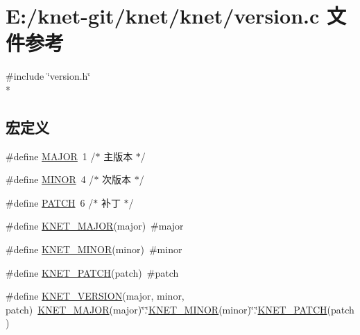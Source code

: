 \hypertarget{a00107}{}\section{E\+:/knet-\/git/knet/knet/version.c 文件参考}
\label{a00107}
{\ttfamily \#include \char`\"{}version.\+h\char`\"{}}\\*
\subsection*{宏定义}
\begin{DoxyCompactItemize}
\item 
\#define \hyperlink{a00107_a877cce34f3e58fd7f9194fab90724cb8_a877cce34f3e58fd7f9194fab90724cb8}{M\+A\+J\+O\+R}~1 /$\ast$ 主版本 $\ast$/
\item 
\#define \hyperlink{a00107_a4e10915d93013542d442d78de0e02e9a_a4e10915d93013542d442d78de0e02e9a}{M\+I\+N\+O\+R}~4 /$\ast$ 次版本 $\ast$/
\item 
\#define \hyperlink{a00107_af59c44c1f3ff875c35393428624473aa_af59c44c1f3ff875c35393428624473aa}{P\+A\+T\+C\+H}~6 /$\ast$ 补丁 $\ast$/
\item 
\#define \hyperlink{a00107_ad4c134c968cc4fc0cc700567eb39c675_ad4c134c968cc4fc0cc700567eb39c675}{K\+N\+E\+T\+\_\+\+M\+A\+J\+O\+R}(major)~\#major
\item 
\#define \hyperlink{a00107_a70224fafcaea5102f9cd726ba926684f_a70224fafcaea5102f9cd726ba926684f}{K\+N\+E\+T\+\_\+\+M\+I\+N\+O\+R}(minor)~\#minor
\item 
\#define \hyperlink{a00107_ae9af7a95a483a187a37d3e9828c6ac1c_ae9af7a95a483a187a37d3e9828c6ac1c}{K\+N\+E\+T\+\_\+\+P\+A\+T\+C\+H}(patch)~\#patch
\item 
\#define \hyperlink{a00107_a96eb274e34ccfa0c0505ca99f2e09a82_a96eb274e34ccfa0c0505ca99f2e09a82}{K\+N\+E\+T\+\_\+\+V\+E\+R\+S\+I\+O\+N}(major,  minor,  patch)~\hyperlink{a00107_ad4c134c968cc4fc0cc700567eb39c675_ad4c134c968cc4fc0cc700567eb39c675}{K\+N\+E\+T\+\_\+\+M\+A\+J\+O\+R}(major)\char`\"{}.\char`\"{}\hyperlink{a00107_a70224fafcaea5102f9cd726ba926684f_a70224fafcaea5102f9cd726ba926684f}{K\+N\+E\+T\+\_\+\+M\+I\+N\+O\+R}(minor)\char`\"{}.\char`\"{}\hyperlink{a00107_ae9af7a95a483a187a37d3e9828c6ac1c_ae9af7a95a483a187a37d3e9828c6ac1c}{K\+N\+E\+T\+\_\+\+P\+A\+T\+C\+H}(patch)
\end{DoxyCompactItemize}
